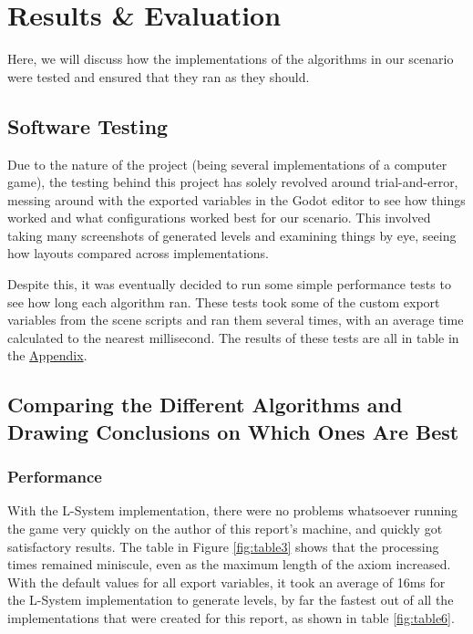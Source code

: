 \chapter{Results \& Evaluation} \label{Evaluation}

Here, we will discuss how the implementations of the algorithms in our scenario were tested and ensured that they ran as they should.

\section{Software Testing}

Due to the nature of the project (being several implementations of a computer game), the testing behind this project has solely revolved around trial-and-error, messing around with the exported variables in the Godot editor to see how things worked and what configurations worked best for our scenario. This involved taking many screenshots of generated levels and examining things by eye, seeing how layouts compared across implementations.

Despite this, it was eventually decided to run some simple performance tests to see how long each algorithm ran. These tests took some of the custom export variables from the scene scripts and ran them several times, with an average time calculated to the nearest millisecond. The results of these tests are all in table in the \hyperref[Appendix]{Appendix}.

\section{Comparing the Different Algorithms and Drawing Conclusions on Which Ones Are Best}

\subsection{Performance} \label{performance}

With the L-System implementation, there were no problems whatsoever running the game very quickly on the author of this report's machine, and quickly got satisfactory results. The table in Figure \ref{fig:table3} shows that the processing times remained miniscule, even as the maximum length of the axiom increased. With the default values for all export variables, it took an average of 16ms for the L-System implementation to generate levels, by far the fastest out of all the implementations that were created for this report, as shown in table \ref{fig:table6}.

